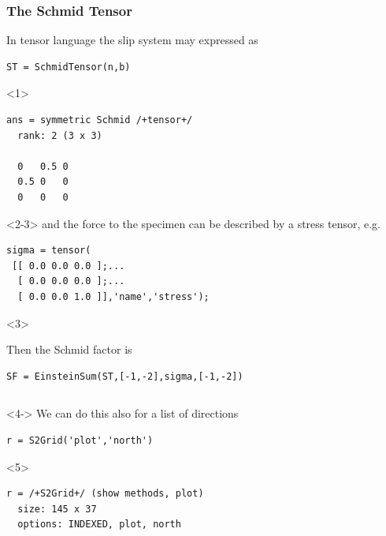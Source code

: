 \documentclass[compress]{beamer}
\begin{document}
\begin{frame}[fragile]
  \frametitle{The Schmid Tensor}

  \begin{overlayarea}{\textwidth}{7cm}
      In tensor language the slip system may expressed as
\begin{lstlisting}[style=input]
ST = SchmidTensor(n,b)
\end{lstlisting}
    \begin{onlyenv}<1>
      \vspace{-0.3cm}
      \begin{lstlisting}[style=output]
ans = symmetric Schmid /+tensor+/
  rank: 2 (3 x 3)

  0   0.5 0
  0.5 0   0
  0   0   0
      \end{lstlisting}
    \end{onlyenv}

\medskip

    \begin{onlyenv}<2-3>
    and the force to the specimen can be described by a stress tensor, e.g.
  \begin{lstlisting}[style=input]
sigma = tensor(
 [[ 0.0 0.0 0.0 ];...
  [ 0.0 0.0 0.0 ];...
  [ 0.0 0.0 1.0 ]],'name','stress');
\end{lstlisting}
    \end{onlyenv}
    \begin{onlyenv}<3>

      \bigskip

Then the Schmid factor is
\begin{lstlisting}[style=input]
SF = EinsteinSum(ST,[-1,-2],sigma,[-1,-2])
\end{lstlisting}
\end{onlyenv}

  \begin{columns}
    \begin{column}{7cm}
      \begin{onlyenv}<4->
  We can do this also for a list of directions
\begin{lstlisting}[style=input]
r = S2Grid('plot','north')
\end{lstlisting}
\end{onlyenv}
      \begin{onlyenv}<5>
        \vspace{-0.3cm}
\begin{lstlisting}[style=output]
r = /+S2Grid+/ (show methods, plot)
  size: 145 x 37
  options: INDEXED, plot, north
\end{lstlisting}
\end{onlyenv}


\end{column}
\end{columns}
\end{overlayarea}
\end{frame}
\end{document}
